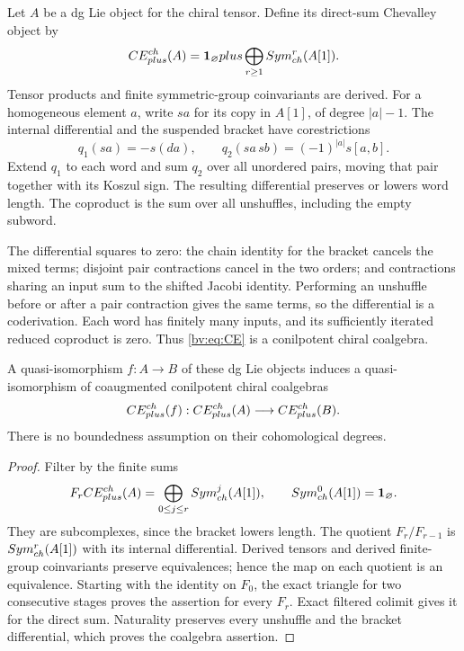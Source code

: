 Let \(A\) be a dg Lie object for the chiral tensor.  Define its
direct-sum Chevalley object by
\begin{equation}\label{bv:eq:CE}
 CE_{plus}^{ch}(A)
 =\mathbf{1}_{\varnothing}plus
   \bigoplus_{r\geq1}Sym_{ch}^r(A[1]).
\end{equation}
Tensor products and finite symmetric-group coinvariants are derived.
For a homogeneous element \(a\), write \(sa\) for its copy in
\(A[1]\), of degree \(|a|-1\).  The internal differential and the
suspended bracket have corestrictions
\[
 q_1(sa)=-s(da),\qquad
 q_2(sa\,sb)=(-1)^{|a|}s[a,b].
\]
Extend \(q_1\) to each word and sum \(q_2\) over all unordered
pairs, moving that pair together with its Koszul sign.  The resulting
differential preserves or lowers word length.  The coproduct is the
sum over all unshuffles, including the empty subword.

The differential squares to zero: the chain identity for the bracket
cancels the mixed terms; disjoint pair contractions cancel in the two
orders; and contractions sharing an input sum to the shifted Jacobi
identity.  Performing an unshuffle before or after a pair contraction
gives the same terms, so the differential is a coderivation.  Each
word has finitely many inputs, and its sufficiently iterated reduced
coproduct is zero.  Thus \eqref{bv:eq:CE} is a conilpotent chiral
coalgebra.

\begin{proposition}
\label{bv:prop:CE}
A quasi-isomorphism \(f:A\to B\) of these dg Lie objects induces a
quasi-isomorphism of coaugmented conilpotent chiral coalgebras
\[
 CE_{plus}^{ch}(f):
 CE_{plus}^{ch}(A)\longrightarrow
 CE_{plus}^{ch}(B).
\]
There is no boundedness assumption on their cohomological degrees.
\end{proposition}

\begin{proof}
Filter by the finite sums
\[
 F_rCE_{plus}^{ch}(A)
 =\bigoplus_{0\leq j\leq r}Sym_{ch}^j(A[1]),
 \qquad Sym_{ch}^0(A[1])=\mathbf{1}_{\varnothing}.
\]
They are subcomplexes, since the bracket lowers length.  The quotient
\(F_r/F_{r-1}\) is \(Sym_{ch}^r(A[1])\) with its internal
differential.  Derived tensors and derived finite-group coinvariants
preserve equivalences; hence the map on each quotient is an
equivalence.  Starting with the identity on \(F_0\), the exact
triangle for two consecutive stages proves the assertion for every
\(F_r\).  Exact filtered colimit gives it for the direct sum.
Naturality preserves every unshuffle and the bracket differential,
which proves the coalgebra assertion.
\end{proof}

